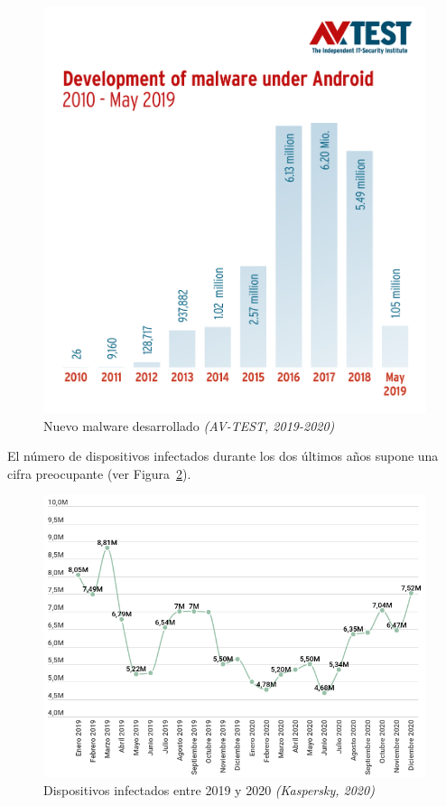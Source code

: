 \begin{figure}[H]
\centering
	\includegraphics[scale=0.25]{img/2010-mayo2019.png}
	\caption{Nuevo malware desarrollado \textit{(AV-TEST, 2019-2020)}}
	\label{fig:avtest}
\end{figure}

El número de dispositivos infectados durante los dos últimos años supone una cifra preocupante (ver Figura~\ref{fig:infectados}).

\begin{figure}[H]
\centering
	\includegraphics[scale=0.35]{img/2019-2020.png}
	\caption{Dispositivos infectados entre 2019 y 2020 \textit{(Kaspersky, 2020)}}
	\label{fig:infectados}
\end{figure}

